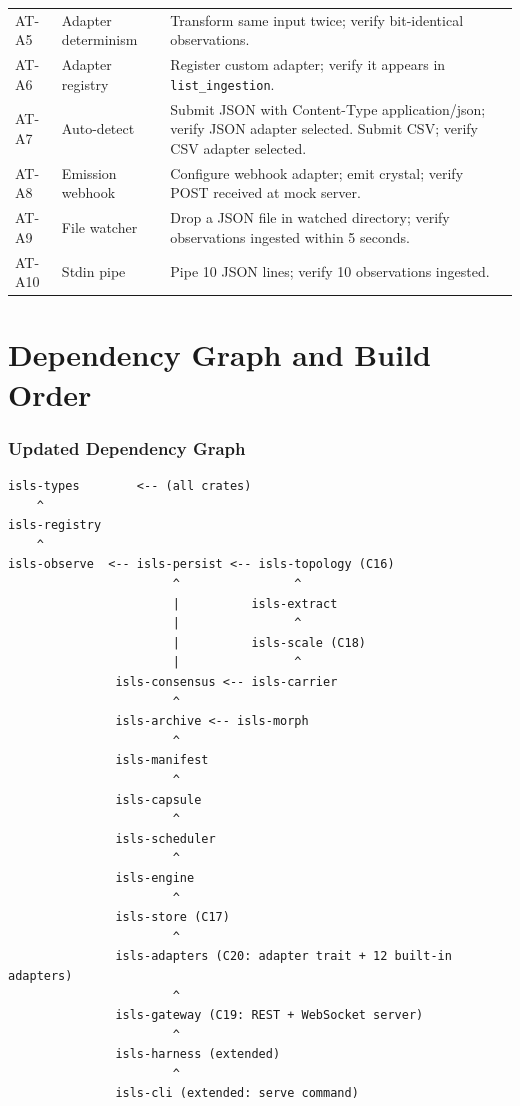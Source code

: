 \documentclass[11pt,a4paper,twoside]{article}
\theoremstyle{definition}
\theoremstyle{plain}
\theoremstyle{remark}
\begin{document}
\begin{longtable}{l l p{6.5cm}}
AT-A5 & Adapter determinism & Transform same input twice; verify
  bit-identical observations. \\
AT-A6 & Adapter registry & Register custom adapter; verify it appears
  in \texttt{list\_ingestion}. \\
AT-A7 & Auto-detect & Submit JSON with Content-Type
  application/json; verify JSON adapter selected. Submit CSV; verify
  CSV adapter selected. \\
AT-A8 & Emission webhook & Configure webhook adapter; emit crystal;
  verify POST received at mock server. \\
AT-A9 & File watcher & Drop a JSON file in watched directory; verify
  observations ingested within 5 seconds. \\
AT-A10 & Stdin pipe & Pipe 10 JSON lines; verify 10 observations
  ingested. \\
\end{longtable}


\part{Dependency Graph and Build Order}\label{part:deps}

\section{Updated Dependency Graph}

\begin{lstlisting}[title={Complete ISLS Dependency Graph after Phase 4}]
isls-types        <-- (all crates)
    ^
isls-registry
    ^
isls-observe  <-- isls-persist <-- isls-topology (C16)
                       ^                ^
                       |          isls-extract
                       |                ^
                       |          isls-scale (C18)
                       |                ^
               isls-consensus <-- isls-carrier
                       ^
               isls-archive <-- isls-morph
                       ^
               isls-manifest
                       ^
               isls-capsule
                       ^
               isls-scheduler
                       ^
               isls-engine
                       ^
               isls-store (C17)
                       ^
               isls-adapters (C20: adapter trait + 12 built-in adapters)
                       ^
               isls-gateway (C19: REST + WebSocket server)
                       ^
               isls-harness (extended)
                       ^
               isls-cli (extended: serve command)
\end{lstlisting}
\end{document}
